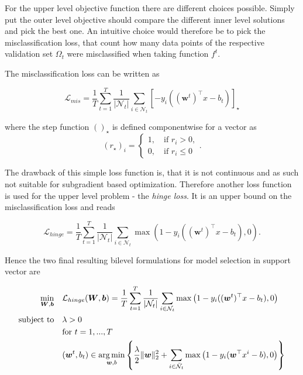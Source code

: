 For the upper level objective function there are different choices possible.
Simply put the outer level objective should compare the different inner level solutions and pick the best one. An intuitive choice would therefore be to pick the misclassification loss, that count how many data points of the respective validation set \(\Omega_t\) were misclassified when taking function \(f^t\).

The misclassification loss can be written as

\begin{equation}
	\mathcal{L}_{mis} = \frac{1}{T}\sum_{t=1}^T\frac{1}{|\mathcal{N}_t|}\sum_{i \in \mathcal{N}_t}{\left[-y_i((\bm{w}^t)^{\top}x-b_t)\right]_{\star}}
\label{misclass_loss}
\end{equation}

where the step function \(()_{\star}\) is defined componentwise for a vector as
\begin{equation}
	(r_{\star})_i = \left\{\begin{array}{c} 1, \quad \text{if } r_i > 0, \\ 0, \quad \text{if } r_i \leq 0 \end{array} \right. .
\label{step_fun}
\end{equation}

The drawback of this simple loss function is, that it is not continuous and as such not suitable for subgradient based optimization. Therefore another loss function is used for the upper level problem - the \emph{hinge loss}. It is an upper bound on the misclassification loss and reads

\begin{equation}
		\mathcal{L}_{hinge} = \frac{1}{T}\sum_{t=1}^T\frac{1}{|\mathcal{N}_t|}\sum_{i \in \mathcal{N}_t}{\max\left(1-y_i((\bm{w}^t)^{\top}x-b_t),0\right)}.
\label{hinge_loss}
\end{equation}

Hence the two final resulting bilevel formulations for model selection in support vector are 

\begin{align}
\begin{split}
	\min_{\bm{W},\bm{b}} \quad &  \mathcal{L}_{hinge}(\bm{W},\bm{b}) = \frac{1}{T}\sum_{t=1}^T\frac{1}{|\mathcal{N}_t|}\sum_{i \in \mathcal{N}_t}{\max\left(1-y_i((\bm{w}^t)^{\top}x-b_t),0\right)}\\
	\text{subject to} \quad &  \lambda > 0 \\
	& \text{for } t = 1,...,T \\
	& (\bm{w}^t,b_t) \in \operatorname*{arg\,min}_{\bm{w},b}\left\{ \frac{\lambda}{2} \|\bm{w}\|^2_2+\sum_{i\in \bar{\mathcal{N}}_t}{\max\left(1-y_i(\bm{w}^{\top}x^i-b),0\right)}\right\} \\
\end{split}
\label{model_1}
\end{align}

